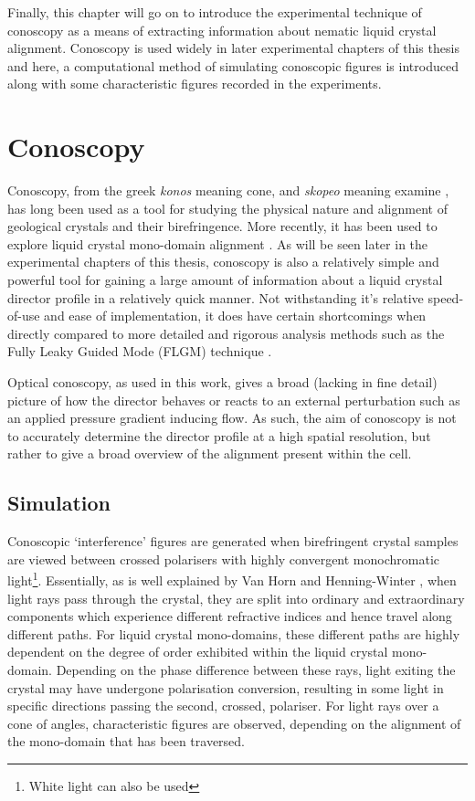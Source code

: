 Finally, this chapter will go on to introduce the experimental technique of conoscopy as a means of extracting information about nematic liquid crystal alignment. Conoscopy is used widely in later experimental chapters of this thesis and here, a computational method of simulating conoscopic figures is introduced along with some characteristic figures recorded in the experiments.

\newpage
\section{Conoscopy}
Conoscopy, from the greek \textit{konos} meaning cone, and \textit{skopeo} meaning examine \cite{wikipedia}, has long been used as a tool for studying the physical nature and alignment of geological crystals and their birefringence. More recently, it has been used to explore liquid crystal mono-domain alignment \cite{Horn2001}. As will be seen later in the experimental chapters of this thesis, conoscopy is also a relatively simple and powerful tool for gaining a large amount of information about a liquid crystal director profile in a relatively quick manner. Not withstanding it's relative speed-of-use and ease of implementation, it does have certain shortcomings when directly compared to more detailed and rigorous analysis methods such as the Fully Leaky Guided Mode (FLGM) technique \cite{Cornford2009,Yang2007,Jewell2005a,Jewell2006,Jewell2007}.

Optical conoscopy, as used in this work, gives a broad (lacking in fine detail) picture of how the director behaves or reacts to an external perturbation such as an applied pressure gradient inducing flow. As such, the aim of conoscopy is not to accurately determine the director profile at a high spatial resolution, but rather to give a broad overview of the alignment present within the cell.

\subsection{Simulation}
Conoscopic `interference' figures are generated when birefringent crystal samples are viewed between crossed polarisers with highly convergent monochromatic light\footnote{White light can also be used}. Essentially, as is well explained by Van Horn and Henning-Winter \cite{Horn2001}, when light rays pass through the crystal, they are split into ordinary and extraordinary components which experience different refractive indices and hence travel along different paths. For liquid crystal mono-domains, these different paths are highly dependent on the degree of order exhibited within the liquid crystal mono-domain. Depending on the phase difference between these rays, light exiting the crystal may have undergone polarisation conversion, resulting in some light in specific directions passing the second, crossed, polariser. For light rays over a cone of angles, characteristic figures are observed, depending on the alignment of the mono-domain that has been traversed.

